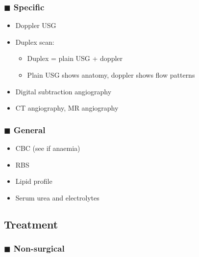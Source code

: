 \documentclass[
  14pt,
]{memoir}
\providecommand{\tightlist}{%
  \setlength{\itemsep}{0pt}\setlength{\parskip}{0pt}}
\begin{document}
\hypertarget{blacksquare-specific}{%
\subsubsection{\texorpdfstring{\(\blacksquare\)
Specific}{\textbackslash blacksquare Specific}}\label{blacksquare-specific}}

\begin{itemize}
\tightlist
\item
  Doppler USG
\item
  Duplex scan:

  \begin{itemize}
  \tightlist
  \item
    Duplex = plain USG + doppler
  \item
    Plain USG shows anatomy, doppler shows flow patterns
  \end{itemize}
\item
  Digital subtraction angiography
\item
  CT angiography, MR angiography
\end{itemize}

\hypertarget{blacksquare-general}{%
\subsubsection{\texorpdfstring{\(\blacksquare\)
General}{\textbackslash blacksquare General}}\label{blacksquare-general}}

\begin{itemize}
\tightlist
\item
  CBC (see if anaemia)
\item
  RBS
\item
  Lipid profile
\item
  Serum urea and electrolytes
\end{itemize}

\hypertarget{treatment-3}{%
\subsection{Treatment}\label{treatment-3}}

\hypertarget{blacksquare-non-surgical}{%
\subsubsection{\texorpdfstring{\(\blacksquare\)
Non-surgical}{\textbackslash blacksquare Non-surgical}}\label{blacksquare-non-surgical}}
\end{document}
